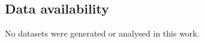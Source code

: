 \documentclass[sn-mathphys-num]{sn-jnl}%
\numberwithin{equation}{section}
\theoremstyle{thmstyleone}%
\theoremstyle{thmstyletwo}%
\theoremstyle{thmstylethree}%
\begin{document}
\subsection*{Data availability} No datasets were generated or analysed in this work.
%
%
%

%
%
%
%
\end{document}
